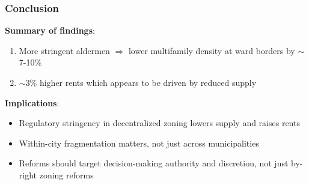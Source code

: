 \begin{frame}
    \frametitle{Conclusion}
    
    \textbf{Summary of findings}:
    \begin{enumerate}
        \item More stringent aldermen $\Rightarrow$ lower multifamily density at ward borders by $\sim$7-10\%
        \item $\sim$3\% higher rents which appears to be driven by reduced supply
    \end{enumerate}

    \vspace{0.5em}
    \textbf{Implications}:
    \begin{itemize}
        \item Regulatory stringency in decentralized zoning lowers supply and raises rents
        \item Within-city fragmentation matters, not just across municipalities
        \item Reforms should target decision-making authority and discretion, not just by-right zoning reforms
    \end{itemize}

\end{frame}
